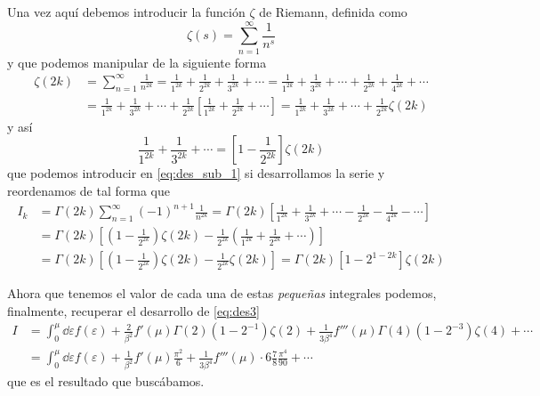 Una vez aquí debemos introducir la función $\zeta$ de Riemann, definida como
\begin{equation}\label{eq:zeta}
	\zeta(s) = \sum_{n=1}^{\infty} \frac{1}{n^{s}}
\end{equation}
y que podemos manipular de la siguiente forma
\begin{align}
	\zeta(2k) &= \sum_{n=1}^{\infty} \frac{1}{n^{2k}} = \frac{1}{1^{2k}} + \frac{1}{2^{2k}} + \frac{1}{3^{2k}} + \cdots = \frac{1}{1^{2k}} + \frac{1}{3^{2k}} + \cdots + \frac{1}{2^{2k}} + \frac{1}{4^{2k}} + \cdots \nonumber \\
		&= \frac{1}{1^{2k}} + \frac{1}{3^{2k}} + \cdots + \frac{1}{2^{2k}}\left[\frac{1}{1^{2k}}  + \frac{1}{2^{2k}} + \cdots \right] =  \frac{1}{1^{2k}} + \frac{1}{3^{2k}} + \cdots + \frac{1}{2^{2k}}\zeta(2k)
\end{align}
y así
\begin{equation}
	\frac{1}{1^{2k}} + \frac{1}{3^{2k}} + \cdots = \left[1 - \frac{1}{2^{2k}} \right] \zeta(2k)
\end{equation}
que podemos introducir en \eqref{eq:des_sub_1} si desarrollamos la serie y reordenamos de tal forma que
\begin{align}\label{eq:des_sub_2}
	I_k &= \Gamma(2k) \sum_{n=1}^{\infty} (-1)^{n+1} \frac{1}{n^{2k}} = \Gamma(2k) \left[ \frac{1}{1^{2k}} + \frac{1}{3^{2k}} + \cdots - \frac{1}{2^{2k}} - \frac{1}{4^{2k}} - \cdots \right]  \nonumber \\
		&= \Gamma(2k) \left[ \left(1 - \frac{1}{2^{2k}} \right) \zeta(2k) - \frac{1}{2^{2k}}\left(\frac{1}{1^{2k}}  + \frac{1}{2^{2k}} + \cdots \right) \right] \\
		&= \Gamma(2k) \left[ \left(1 - \frac{1}{2^{2k}} \right) \zeta(2k) - \frac{1}{2^{2k}}\zeta(2k) \right] = \Gamma(2k)\left[ 1-2^{1-2k} \right] \zeta(2k)\nonumber
\end{align}

Ahora que tenemos el valor de cada una de estas \emph{pequeñas} integrales podemos, finalmente, recuperar el desarrollo de \eqref{eq:des3}
\begin{align}\label{eq:des4}
	I &= \int_{0}^{\mu} \dd{\varepsilon} f(\varepsilon) + \frac{2}{\beta^2}f'(\mu) \Gamma(2)(1-2^{-1})\zeta(2) + \frac{1}{3\beta^4}f'''(\mu) \Gamma(4)(1-2^{-3})\zeta(4) + \cdots  \nonumber \\
		&= \int_{0}^{\mu} \dd{\varepsilon} f(\varepsilon) + \frac{1}{\beta^2}f'(\mu) \frac{\pi^2}{6} + \frac{1}{3\beta^4}f'''(\mu) \cdot 6 \frac{7}{8}\frac{\pi^4}{90} + \cdots
\end{align}
que es el resultado que buscábamos.

